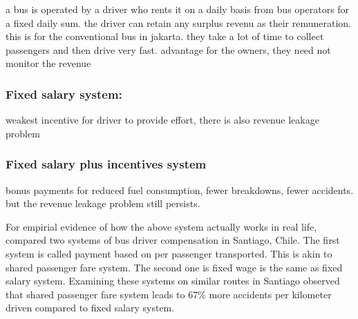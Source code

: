 \documentclass[11pt,]{article}
\begin{document}
a bus is operated by a driver who rents it on a daily basis from bus
operators for a fixed daily sum. the driver can retain any surplus
revenu as their remuneration. this is for the conventional bus in
jakarta. they take a lot of time to collect passengers and then drive
very fast. advantage for the owners, they need not monitor the revenue

\subsubsection{Fixed salary system:}\label{fixed-salary-system}

weakest incentive for driver to provide effort, there is also revenue
leakage problem

\subsubsection{Fixed salary plus incentives
system}\label{fixed-salary-plus-incentives-system}

bonus payments for reduced fuel consumption, fewer breakdowns, fewer
accidents. but the revenue leakage problem still persists.

For empirial evidence of how the above system actually works in real
life, \textcite{johnson_war_2015} compared two systems of bus driver
compensation in Santiago, Chile. The first system is called payment
based on per passenger transported. This is akin to shared passenger
fare system. The second one is fixed wage is the same as fixed salary
system. Examining these systems on similar routes in Santiago
\textcite{johnson_war_2015} observed that shared passenger fare system
leads to 67\% more accidents per kilometer driven compared to fixed
salary system.




\newpage
\singlespacing 
\printbibliography[title=References]
\end{document}
